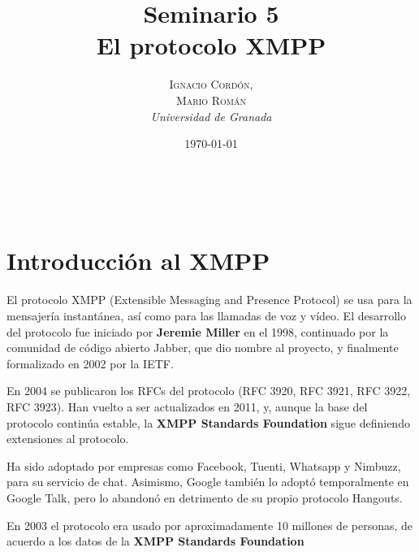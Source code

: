 \documentclass[a4paper, 11pt]{article} %
\title{\textbf{Seminario 5}\\ %
El protocolo XMPP} %
\author{\textsc{Ignacio Cordón,\\Mario Román} %
\\{\textit{Universidad de Granada}}} %
\date{\today} %
\makeatletter
\renewcommand{\maketitle}{ %
\begin{flushright} %
    {\LARGE\@title} %
    
    \vspace{50pt} %
    
    {\large\@author} %
    \\\@date %
    
    \vspace{40pt} %
\end{flushright}
}
\makeatother
\begin{document}
\maketitle %



\renewcommand{\abstractname}{Resumen} %
\begin{abstract}
\end{abstract}
{\parskip=2pt
\tableofcontents
}
\pagebreak



\section{Introducción al XMPP}
  El protocolo XMPP (Extensible Messaging and Presence Protocol) se usa para la mensajería
  instantánea, así como para las llamadas de voz y vídeo. El desarrollo del protocolo fue
  iniciado por \textbf{Jeremie Miller} en el 1998, continuado por la comunidad de código abierto Jabber, que dio
  nombre al proyecto, y finalmente formalizado en 2002 por la IETF.
  
  En 2004 se publicaron los RFCs del protocolo (RFC 3920, RFC 3921, RFC 3922, RFC 3923). Han vuelto a ser actualizados en 2011, y, aunque
  la base del protocolo continúa estable, la \textbf{XMPP Standards Foundation} sigue definiendo extensiones
  al protocolo.
  
  Ha sido adoptado por empresas como Facebook, Tuenti, Whatsapp y Nimbuzz, para su servicio de chat. Asimismo, Google
  también lo adoptó temporalmente en Google Talk, pero lo abandonó en detrimento de su propio protocolo Hangouts.

  En 2003 el protocolo era usado por aproximadamente 10 millones de personas, de acuerdo a los datos de la \textbf{XMPP
  Standards Foundation}	
   
\end{document}
